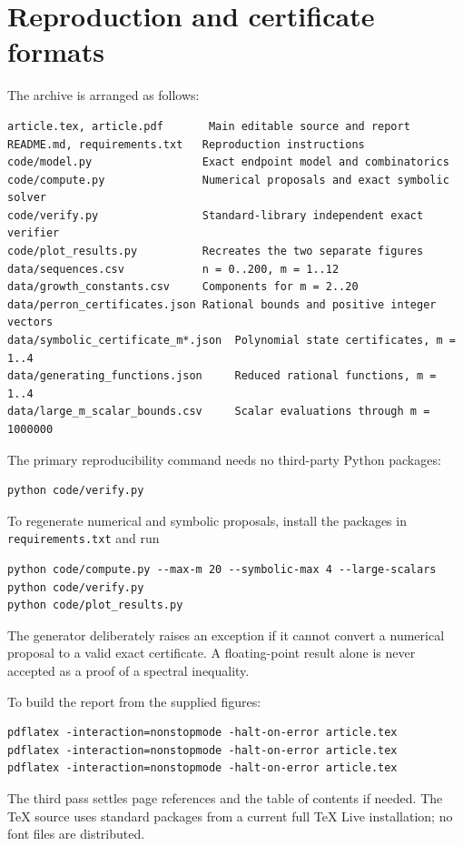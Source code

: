 \documentclass[11pt,a4paper]{article}
\theoremstyle{definition}\newaliascnt{definition}{theorem}
\theoremstyle{remark}\newaliascnt{remark}{theorem}
\begin{document}
\section{Reproduction and certificate formats}
\label{app:reproduction}
The archive is arranged as follows:
\begin{lstlisting}
article.tex, article.pdf       Main editable source and report
README.md, requirements.txt   Reproduction instructions
code/model.py                 Exact endpoint model and combinatorics
code/compute.py               Numerical proposals and exact symbolic solver
code/verify.py                Standard-library independent exact verifier
code/plot_results.py          Recreates the two separate figures
data/sequences.csv            n = 0..200, m = 1..12
data/growth_constants.csv     Components for m = 2..20
data/perron_certificates.json Rational bounds and positive integer vectors
data/symbolic_certificate_m*.json  Polynomial state certificates, m = 1..4
data/generating_functions.json     Reduced rational functions, m = 1..4
data/large_m_scalar_bounds.csv     Scalar evaluations through m = 1000000
\end{lstlisting}

The primary reproducibility command needs no third-party Python packages:
\begin{lstlisting}
python code/verify.py
\end{lstlisting}
To regenerate numerical and symbolic proposals, install the packages in
\texttt{requirements.txt} and run
\begin{lstlisting}
python code/compute.py --max-m 20 --symbolic-max 4 --large-scalars
python code/verify.py
python code/plot_results.py
\end{lstlisting}
The generator deliberately raises an exception if it cannot convert a
numerical proposal to a valid exact certificate. A floating-point result
alone is never accepted as a proof of a spectral inequality.

To build the report from the supplied figures:
\begin{lstlisting}
pdflatex -interaction=nonstopmode -halt-on-error article.tex
pdflatex -interaction=nonstopmode -halt-on-error article.tex
pdflatex -interaction=nonstopmode -halt-on-error article.tex
\end{lstlisting}
The third pass settles page references and the table of contents if needed.
The TeX source uses standard packages from a current full TeX Live
installation; no font files are distributed.
\end{document}
